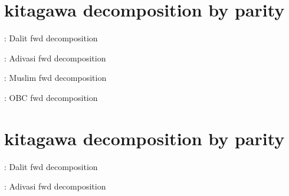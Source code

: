 \documentclass{article}
\begin{document}
\maketitle


\section{kitagawa decomposition by parity}

\begin{table}[H]
    \centering
    \footnotesize %
    \caption{: Dalit fwd decomposition}
    \label{tab:sumstat}
\end{table}

\begin{table}[H]
    \centering
    \footnotesize %
    \caption{: Adivasi fwd decomposition}
    \label{tab:sumstat}
\end{table}



\begin{table}[H]
    \centering
    \footnotesize %
    \caption{: Muslim fwd decomposition}
    \label{tab:sumstat}
\end{table}

\begin{table}[H]
    \centering
    \footnotesize %
    \caption{: OBC fwd decomposition}
    \label{tab:sumstat}
\end{table}





\section{kitagawa decomposition by parity}

\begin{table}[H]
    \centering
    \footnotesize %
    \caption{: Dalit fwd decomposition}
    \label{tab:sumstat}
\end{table}

\begin{table}[H]
    \centering
    \footnotesize %
    \caption{: Adivasi fwd decomposition}
    \label{tab:sumstat}
\end{table}
\end{document}
